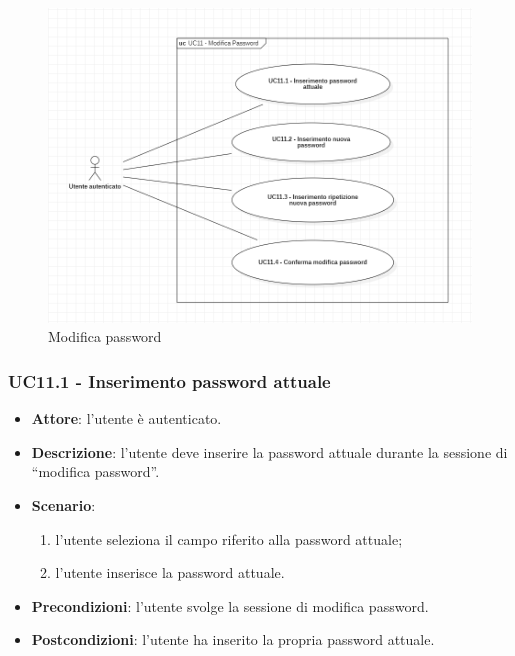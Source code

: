 \begin{figure}[!h]
    \includegraphics[width=15cm]{sezioni/Images/UC11_s.png}
    \centering
    \caption{Modifica password}
\end{figure}

\subsubsection{UC11.1 - Inserimento password attuale} 
\begin{itemize}
    \item \textbf{Attore}: l'utente è autenticato.
    \item \textbf{Descrizione}: l'utente deve inserire la password attuale durante la sessione di “modifica password”.
    \item \textbf{Scenario}:
    \begin{enumerate}
        \item l'utente seleziona il campo riferito alla password attuale;
        \item l'utente inserisce la password attuale.
    \end{enumerate}

    \item \textbf{Precondizioni}: l'utente svolge la sessione di modifica password.
    \item \textbf{Postcondizioni}: l'utente ha inserito la propria password attuale.

\end{itemize}

